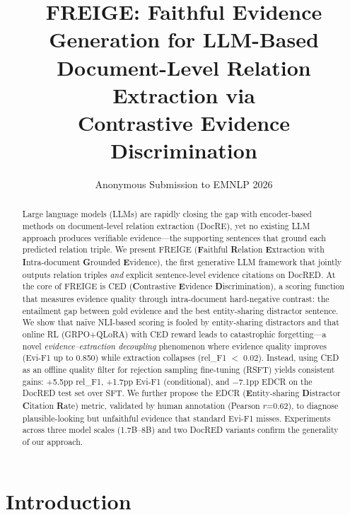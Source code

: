 \documentclass[11pt,a4paper]{article}
\title{FREIGE: Faithful Evidence Generation for LLM-Based\\Document-Level Relation Extraction via\\Contrastive Evidence Discrimination}
\author{Anonymous Submission to EMNLP 2026}
\date{}
\newcommand{\method}{FREIGE}
\newcommand{\ced}{CED}
\newcommand{\edcr}{EDCR}
\newcommand{\rsft}{RSFT}
\begin{document}
\maketitle

\begin{abstract}
Large language models (LLMs) are rapidly closing the gap with encoder-based methods on document-level relation extraction (DocRE), yet no existing LLM approach produces verifiable evidence---the supporting sentences that ground each predicted relation triple.
We present \method{} (\textbf{F}aithful \textbf{R}elation \textbf{E}xtraction with \textbf{I}ntra-document \textbf{G}rounded \textbf{E}vidence), the first generative LLM framework that jointly outputs relation triples \emph{and} explicit sentence-level evidence citations on DocRED.
At the core of \method{} is \ced{} (\textbf{C}ontrastive \textbf{E}vidence \textbf{D}iscrimination), a scoring function that measures evidence quality through intra-document hard-negative contrast: the entailment gap between gold evidence and the best entity-sharing distractor sentence.
We show that na\"ive NLI-based scoring is fooled by entity-sharing distractors and that online RL (GRPO+QLoRA) with \ced{} reward leads to catastrophic forgetting---a novel \emph{evidence--extraction decoupling} phenomenon where evidence quality improves (Evi-F1 up to 0.850) while extraction collapses (rel\_F1 $<$ 0.02).
Instead, using \ced{} as an offline quality filter for rejection sampling fine-tuning (\rsft{}) yields consistent gains: +5.5pp rel\_F1, +1.7pp Evi-F1 (conditional), and $-$7.1pp \edcr{} on the DocRED test set over SFT.
We further propose the \edcr{} (\textbf{E}ntity-sharing \textbf{D}istractor \textbf{C}itation \textbf{R}ate) metric, validated by human annotation (Pearson $r$=0.62), to diagnose plausible-looking but unfaithful evidence that standard Evi-F1 misses.
Experiments across three model scales (1.7B--8B) and two DocRED variants confirm the generality of our approach.
\end{abstract}

\section{Introduction}
\label{sec:intro}
\end{document}
